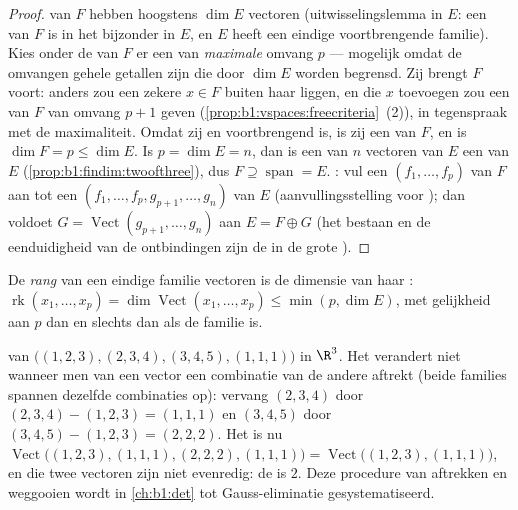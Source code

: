 \begin{proof}
 van $F$ hebben hoogstens $\dim E$ vectoren
(uitwisselingslemma in $E$: een  van $F$ is in het
bijzonder  in $E$, en $E$ heeft een eindige voortbrengende
familie). Kies onder de  van $F$ er een van
\emph{maximale} omvang $p$ --- mogelijk omdat de omvangen gehele
getallen zijn die door $\dim E$ worden begrensd. Zij brengt $F$
voort: anders zou een zekere $x \in F$ buiten haar  liggen,
en die $x$ toevoegen zou een  van $F$ van omvang $p +
1$ geven (\cref{prop:b1:vspaces:freecriteria}~(2)), in tegenspraak
met de maximaliteit. Omdat zij  en voortbrengend is, is zij een
 van $F$, en is $\dim F = p \leq \dim E$. Is $p = \dim E = n$,
dan is een  van $n$ vectoren van $E$ een  van $E$
(\cref{prop:b1:findim:twoofthree}), dus $F \supseteq
\operatorname{span} = E$. : vul een  $(f_1, \dots,
f_p)$ van $F$ aan tot een  $(f_1, \dots, f_p, g_{p+1}, \dots,
g_n)$ van $E$ (aanvullingsstelling voor ); dan voldoet $G =
\operatorname{Vect}(g_{p+1}, \dots, g_n)$ aan $E = F \oplus G$ (het
bestaan en de eenduidigheid van de ontbindingen zijn de 
in de grote ).
\end{proof}

\begin{definition}\label{def:b1:findim:rank}
De \emph{rang} van een eindige familie
vectoren is de dimensie van haar :
$\operatorname{rk}(x_1, \dots, x_p) = \dim
\operatorname{Vect}(x_1, \dots, x_p) \leq \min(p, \dim E)$, met
gelijkheid aan $p$ dan en slechts dan als de familie  is.
\end{definition}

\begin{example}
\label{ex:b1:findim:rankcomputation}
 van $\bigl((1,2,3), (2,3,4), (3,4,5), (1,1,1)\bigr)$ in
$\R^3$. Het  verandert niet wanneer men van een vector
een combinatie van de andere aftrekt (beide families spannen
dezelfde combinaties op): vervang $(2,3,4)$ door $(2,3,4) -
(1,2,3) = (1,1,1)$ en $(3,4,5)$ door $(3,4,5) - (1,2,3) =
(2,2,2)$. Het  is nu $\operatorname{Vect}\bigl((1,2,3),
(1,1,1), (2,2,2), (1,1,1)\bigr) =
\operatorname{Vect}\bigl((1,2,3), (1,1,1)\bigr)$, en die twee
vectoren zijn niet evenredig: de  is $2$. Deze procedure van
aftrekken en weggooien wordt in \cref{ch:b1:det} tot
Gauss-eliminatie gesystematiseerd.
\end{example}

